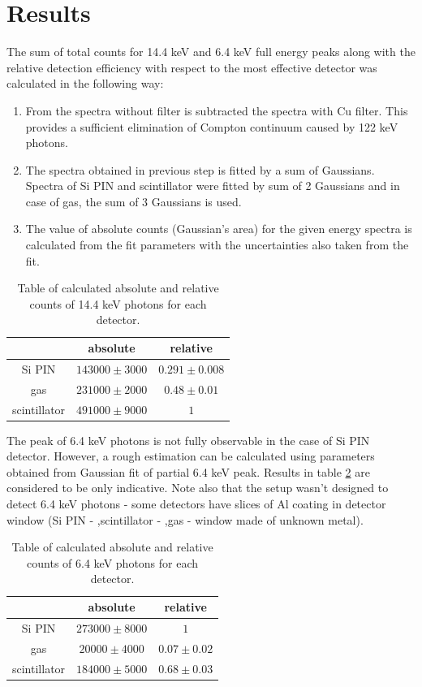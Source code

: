 \section{Results}
The sum of total counts for 14.4 keV and 6.4 keV full energy peaks along with the relative detection efficiency with respect to the most effective detector was calculated in the following way:

\begin{enumerate}
\item From the spectra without filter is subtracted the spectra with Cu filter. This provides a sufficient elimination of Compton continuum caused by 122 keV photons. 
\item The spectra obtained in previous step is fitted by a sum of Gaussians. Spectra of Si PIN and scintillator were fitted by sum of 2 Gaussians and in case of gas, the sum of 3 Gaussians is used.
\item The value of absolute counts (Gaussian's area) for the given energy spectra is calculated from the fit parameters with the uncertainties also taken from the fit.
\end{enumerate}




\begin{table}[H]
\centering
\begin{tabular}{|c|c|c|}
\hline
   & absolute & relative \\ \hline
Si PIN & $143000 \pm 3000$    & $0.291 \pm 0.008$  \\ \hline
gas & $231000 \pm 2000$    & $0.48 \pm  0.01$ \\ \hline
scintillator  & $491000 \pm 9000$    & $1$ \\ \hline
\end{tabular}
\caption{Table of calculated absolute and relative counts of 14.4 keV photons for each detector.}
 \label{144kevEFF}
\end{table}


The peak of 6.4 keV photons is not fully observable in the case of Si PIN detector. However, a rough estimation can be calculated using parameters obtained from Gaussian fit of partial 6.4 keV peak. Results in table \ref{64kevEFF} are considered to be only indicative. Note also that the setup wasn't designed to detect 6.4 keV photons - some detectors have slices of Al coating in detector window (Si PIN - ,scintillator - ,gas - window made of unknown metal).  

\begin{table}[H]
\centering
\begin{tabular}{|c|c|c|}
\hline
   & absolute & relative \\ \hline
Si PIN & $273000 \pm 8000$    & $1$  \\ \hline
gas & $20000 \pm 4000$    & $0.07 \pm 0.02$ \\ \hline
scintillator  & $184000 \pm 5000$    & $0.68 \pm 0.03$ \\ \hline
\end{tabular}
\caption{Table of calculated absolute and relative counts of 6.4 keV photons for each detector.}
 \label{64kevEFF}
\end{table}


